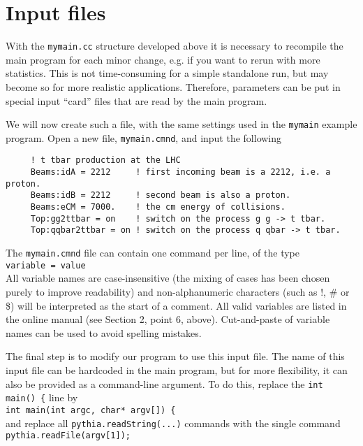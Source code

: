 \documentclass[12pt,a4paper]{article}
\begin{document}
\section{Input files}

With the \texttt{mymain.cc} structure developed above it is necessary to
recompile the main program for each minor change, e.g. if you want to
rerun with more statistics. This is not time-consuming for a simple 
standalone run, but may become so for more realistic applications.
Therefore, parameters can be put in special input ``card'' files
that are read by the main program. 

We will now create such a file, with the same settings used in the
\texttt{mymain} example program. Open a new file, \texttt{mymain.cmnd}, and
input the following
\begin{verbatim}
     ! t tbar production at the LHC
     Beams:idA = 2212     ! first incoming beam is a 2212, i.e. a proton.  
     Beams:idB = 2212     ! second beam is also a proton. 
     Beams:eCM = 7000.    ! the cm energy of collisions. 
     Top:gg2ttbar = on    ! switch on the process g g -> t tbar.  
     Top:qqbar2ttbar = on ! switch on the process q qbar -> t tbar.  
\end{verbatim}

The \texttt{mymain.cmnd} file can contain one command per line,
of the type\\
\hspace*{10mm}\texttt{variable = value}\\
All variable names are case-insensitive (the mixing of cases has been
chosen purely to improve readability) and non-alphanumeric characters
(such as !, \# or \$) will be interpreted as the start of a comment. All
valid variables are listed in the online manual (see Section 2, point 6,
above). Cut-and-paste of variable names can be used to avoid spelling
mistakes.

The final step is to modify our program to use this input file. The name of
this input file can be hardcoded in the main program, but for more
flexibility, it can also be provided as a command-line argument. To do
this, replace the \texttt{int main() \{} line by \\
\hspace*{10mm} \texttt{int main(int argc, char* argv[]) \{}\\
and replace all \texttt{pythia.readString(...)} commands with the single
command
\hspace*{10mm}\texttt{pythia.readFile(argv[1]);} 
\end{document}
